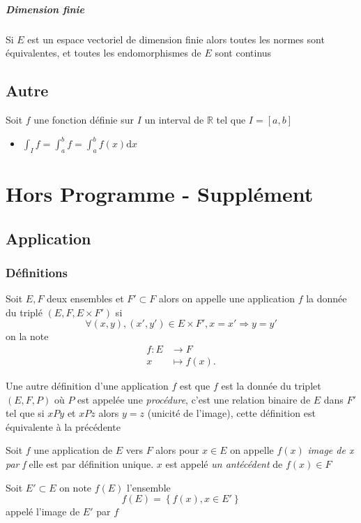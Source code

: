 \documentclass[11pt,colorlinks]{book}
\theoremstyle{mytheoremstyle}
\theoremstyle{mytheoremstyle}
\theoremstyle{mytheoremstyle}
\theoremstyle{mytheoremstyle}
\theoremstyle{mytheoremstyle}
\theoremstyle{mytheoremstyle}
\theoremstyle{mytheoremstyle}
\theoremstyle{mytheoremstyle}
\theoremstyle{myproblemstyle}
\def\mbb#1{\mathbb{#1}}
\def\bR{\mbb{R}}
\def\ev{espace vectoriel }
\newcommand{\vfunc}[5]{
  \begin{align*}
    #1 \colon #2 &\to #3\\
    #4 &\mapsto #5.
  \end{align*}
}
\begin{document}
\paragraph{Dimension finie}
\begin{definition}
  Si $E$ est un \ev de dimension finie alors toutes les normes sont équivalentes, et toutes les endomorphismes de $E$ sont continus
\end{definition}
\section{Autre}
\begin{rmq}
  Soit $f$ une fonction définie sur $I$ un interval de $\bR$ tel que $I = [a,b]$
  \begin{itemize}
    \item $\int_I f = \int_a^b f = \int_a^b f(x) \text{d}x$
  \end{itemize}
\end{rmq}
\chapter{Hors Programme - Supplément}
\section{Application}
\subsection{Définitions}
\begin{definition}
  Soit $E,F$ deux ensembles et $F' \subset F$ alors on appelle une application $f$ la donnée du triplé $(E,F,E\times F')$ si
  \begin{equation*}
    \forall (x,y),(x',y') \in E\times F', x=x' \Rightarrow y=y'
  \end{equation*}
  on la note \vfunc{f}{E}{F}{x}{f(x)}
\end{definition}
\begin{definition}
  Une autre définition d'une application $f$ est que $f$ est la donnée du triplet $(E,F,P)$ où $P$ est appelée une \textit{procédure}, c'est 
  une relation binaire de $E$ dans $F'$ tel que si $xPy$ et $xPz$ alors $y=z$ (unicité de l'image), cette définition est équivalente à la précédente
\end{definition}
\begin{definition}
  Soit $f$ une application de $E$ vers $F$ alors pour $x\in E$ on appelle $f(x)$ \textit{image de x par f} elle est par définition unique. $x$ est appelé 
  \textit{un antécédent} de $f(x) \in F$ 
\end{definition}
\begin{definition}
  Soit $E' \subset E$ on note $f(E)$ l'ensemble 
  \begin{equation*}
    f(E) = \left\{f(x), x\in E'\right\}
  \end{equation*}
  appelé l'image de $E'$ par $f$
\end{definition}
\end{document}
